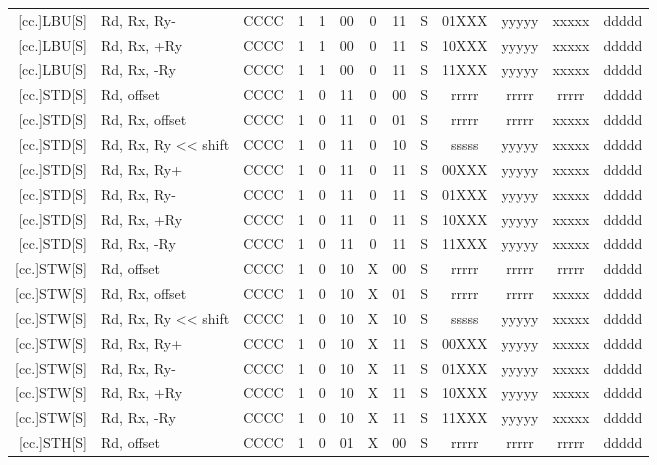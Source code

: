\documentclass{article}
\begin{document}
\begin{longtable}{|r|l|c|c|c|c|c|c|c|ccc|c|}
        {[}cc.]LBU[S] & Rd, Rx, Ry- & CCCC & 1 & 1 & 00 & 0 & 11 & S & 01XXX & yyyyy & xxxxx & ddddd \\
        {[}cc.]LBU[S] & Rd, Rx, +Ry & CCCC & 1 & 1 & 00 & 0 & 11 & S & 10XXX & yyyyy & xxxxx & ddddd \\
        {[}cc.]LBU[S] & Rd, Rx, -Ry & CCCC & 1 & 1 & 00 & 0 & 11 & S & 11XXX & yyyyy & xxxxx & ddddd \\
        \hline %
        {[}cc.]STD[S] & Rd, offset & CCCC & 1 & 0 & 11 & 0 & 00 & S & rrrrr & rrrrr & rrrrr & ddddd \\
        {[}cc.]STD[S] & Rd, Rx, offset & CCCC & 1 & 0 & 11 & 0 & 01 & S & rrrrr & rrrrr & xxxxx & ddddd \\
        {[}cc.]STD[S] & Rd, Rx, Ry << shift & CCCC & 1 & 0 & 11 & 0 & 10 & S & sssss & yyyyy & xxxxx & ddddd \\
        {[}cc.]STD[S] & Rd, Rx, Ry+ & CCCC & 1 & 0 & 11 & 0 & 11 & S & 00XXX & yyyyy & xxxxx & ddddd \\
        {[}cc.]STD[S] & Rd, Rx, Ry- & CCCC & 1 & 0 & 11 & 0 & 11 & S & 01XXX & yyyyy & xxxxx & ddddd \\
        {[}cc.]STD[S] & Rd, Rx, +Ry & CCCC & 1 & 0 & 11 & 0 & 11 & S & 10XXX & yyyyy & xxxxx & ddddd \\
        {[}cc.]STD[S] & Rd, Rx, -Ry & CCCC & 1 & 0 & 11 & 0 & 11 & S & 11XXX & yyyyy & xxxxx & ddddd \\
        \hline %
        {[}cc.]STW[S] & Rd, offset & CCCC & 1 & 0 & 10 & X & 00 & S & rrrrr & rrrrr & rrrrr & ddddd \\
        {[}cc.]STW[S] & Rd, Rx, offset & CCCC & 1 & 0 & 10 & X & 01 & S & rrrrr & rrrrr & xxxxx & ddddd \\
        {[}cc.]STW[S] & Rd, Rx, Ry << shift & CCCC & 1 & 0 & 10 & X & 10 & S & sssss & yyyyy & xxxxx & ddddd \\
        {[}cc.]STW[S] & Rd, Rx, Ry+ & CCCC & 1 & 0 & 10 & X & 11 & S & 00XXX & yyyyy & xxxxx & ddddd \\
        {[}cc.]STW[S] & Rd, Rx, Ry- & CCCC & 1 & 0 & 10 & X & 11 & S & 01XXX & yyyyy & xxxxx & ddddd \\
        {[}cc.]STW[S] & Rd, Rx, +Ry & CCCC & 1 & 0 & 10 & X & 11 & S & 10XXX & yyyyy & xxxxx & ddddd \\
        {[}cc.]STW[S] & Rd, Rx, -Ry & CCCC & 1 & 0 & 10 & X & 11 & S & 11XXX & yyyyy & xxxxx & ddddd \\
        \hline %
        {[}cc.]STH[S] & Rd, offset & CCCC & 1 & 0 & 01 & X & 00 & S & rrrrr & rrrrr & rrrrr & ddddd \\

\end{longtable}
\end{document}
